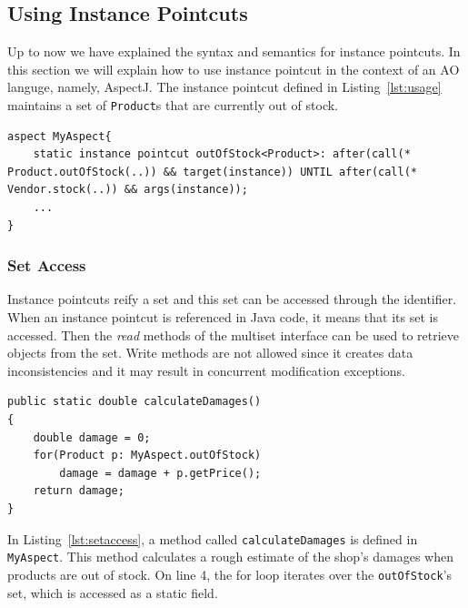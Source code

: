 \documentclass{acm_proc_article-sp}
\begin{document}
\subsection{Using Instance Pointcuts}
Up to now we have explained the syntax and semantics for instance pointcuts. In this section we will explain how to use instance pointcut in the context of an AO languge, namely, AspectJ. The instance pointcut defined in Listing~\ref{lst:usage} maintains a set of \texttt{Product}s that are currently out of stock.

\begin{lstlisting}[float=h!, caption={An instance pointcut for out of stock products}, label={lst:usage}]
aspect MyAspect{
	static instance pointcut outOfStock<Product>: after(call(* Product.outOfStock(..)) && target(instance)) UNTIL after(call(* Vendor.stock(..)) && args(instance));
	...
}
\end{lstlisting}

\subsubsection{Set Access}
Instance pointcuts reify a set and this set can be accessed through the identifier. When an instance  pointcut is referenced in Java code, it means that its set is accessed. Then the \emph{read} methods of the multiset interface can be used to retrieve objects from the set. Write methods are not allowed since it creates data inconsistencies and it may result in concurrent modification exceptions. 


\begin{lstlisting}[float=h!, caption={Calculate a damage estimate for out of stock products}, label={lst:setaccess}]
public static double calculateDamages()
{
	double damage = 0;
	for(Product p: MyAspect.outOfStock)
		damage = damage + p.getPrice();
	return damage;
}
\end{lstlisting}

In Listing~\ref{lst:setaccess},  a method called \texttt{calculateDamages} is defined in \texttt{MyAspect}. This method calculates a rough estimate of the shop's damages when products are out of stock. On line 4, the for loop iterates over the \texttt{outOfStock}'s set, which is accessed as a static field.
\end{document}
